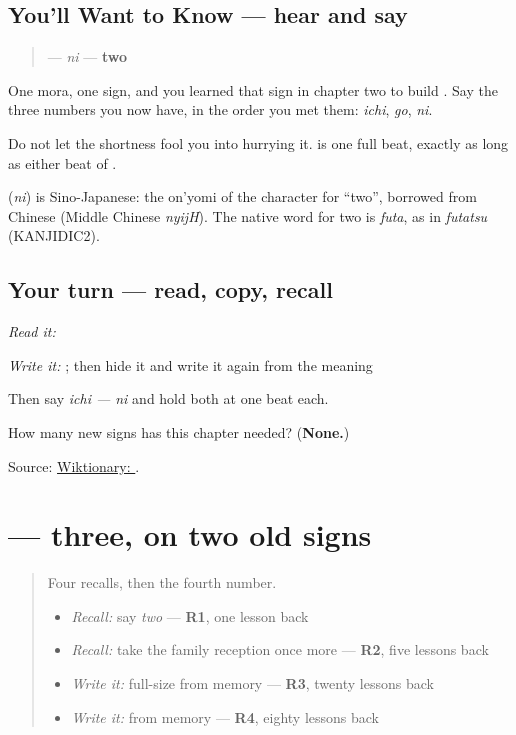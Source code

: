 \subsection*{You'll Want to Know — hear and say}
\begin{quote}
\textbf{} — \emph{ni} — \textbf{two}
\end{quote}

One mora, one sign, and you learned that sign in chapter two to build \textbf{}. Say the three numbers you now have, in the order you met them: \emph{ichi}, \emph{go}, \emph{ni}.

Do not let the shortness fool you into hurrying it. \textbf{} is one full beat, exactly as long as either beat of \textbf{}.

\begin{cousinweb}
\textbf{} (\emph{ni}) is Sino-Japanese: the on'yomi of the character for \textquotedblleft{}two\textquotedblright{}, borrowed from Chinese (Middle Chinese \emph{nyijH}). The native word for two is \emph{futa}, as in \emph{futatsu} (KANJIDIC2).
\end{cousinweb}

\subsection*{Your turn — read, copy, recall}
\emph{Read it:} \textbf{}

\emph{Write it:} \textbf{}; then hide it and write it again from the meaning

Then say \emph{ichi — ni} and hold both at one beat each.

\begin{tcolorbox}[breakable,colback=teal!4,colframe=teal!35!black,title={Before you move on}]
How many new signs has this chapter needed? (\textbf{None.})

Source: \href{https://en.wiktionary.org/wiki/\%E3\%81\%AB}{Wiktionary: }.
\end{tcolorbox}
\section[\texorpdfstring{\ja{さん} (san)}{さん (san)}]{ — three, on two old signs}

\label{lesson:JA-C14-san}



\begin{quote}
Four recalls, then the fourth number.

\begin{itemize}
\raggedright
  \item \emph{Recall:} say \emph{two} — \textbf{R1}, one lesson back
  \item \emph{Recall:} take the family reception once more — \textbf{R2}, five lessons back
  \item \emph{Write it:} full-size \textbf{} from memory — \textbf{R3}, twenty lessons back
  \item \emph{Write it:} \textbf{} from memory — \textbf{R4}, eighty lessons back
\end{itemize}
\end{quote}

